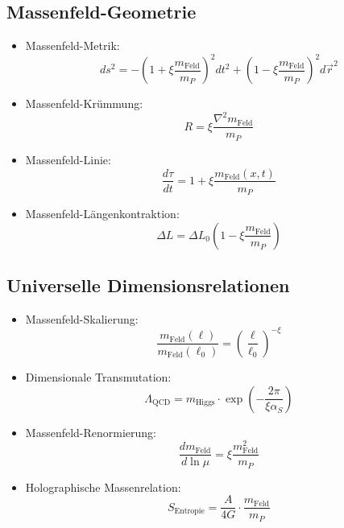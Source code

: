 \documentclass[12pt,a4paper]{article}
\begin{document}
\subsection{Massenfeld-Geometrie}
\begin{itemize}
	\item Massenfeld-Metrik:
	\begin{equation}
		ds^2 = -\left(1 + \xi \frac{m_{\text{Feld}}}{m_P}\right)^2 dt^2 + \left(1 - \xi \frac{m_{\text{Feld}}}{m_P}\right)^2 d\vec{r}^2
	\end{equation}
	
	\item Massenfeld-Krümmung:
	\begin{equation}
		R = \xi \frac{\nabla^2 m_{\text{Feld}}}{m_P}
	\end{equation}
	
	\item Massenfeld-Linie:
	\begin{equation}
		\frac{d\tau}{dt} = 1 + \xi \frac{m_{\text{Feld}}(x,t)}{m_P}
	\end{equation}
	
	\item Massenfeld-Längenkontraktion:
	\begin{equation}
		\Delta L = \Delta L_0 \left(1 - \xi \frac{m_{\text{Feld}}}{m_P}\right)
	\end{equation}
\end{itemize}

\subsection{Universelle Dimensionsrelationen}
\begin{itemize}
	\item Massenfeld-Skalierung:
	\begin{equation}
		\frac{m_{\text{Feld}}(\ell)}{m_{\text{Feld}}(\ell_0)} = \left(\frac{\ell}{\ell_0}\right)^{-\xi}
	\end{equation}
	
	\item Dimensionale Transmutation:
	\begin{equation}
		\Lambda_{\text{QCD}} = m_{\text{Higgs}} \cdot \exp\left(-\frac{2\pi}{\xi \alpha_S}\right)
	\end{equation}
	
	\item Massenfeld-Renormierung:
	\begin{equation}
		\frac{dm_{\text{Feld}}}{d\ln\mu} = \xi \frac{m_{\text{Feld}}^2}{m_P}
	\end{equation}
	
	\item Holographische Massenrelation:
	\begin{equation}
		S_{\text{Entropie}} = \frac{A}{4G} \cdot \frac{m_{\text{Feld}}}{m_P}
	\end{equation}
\end{itemize}	
\end{document}
